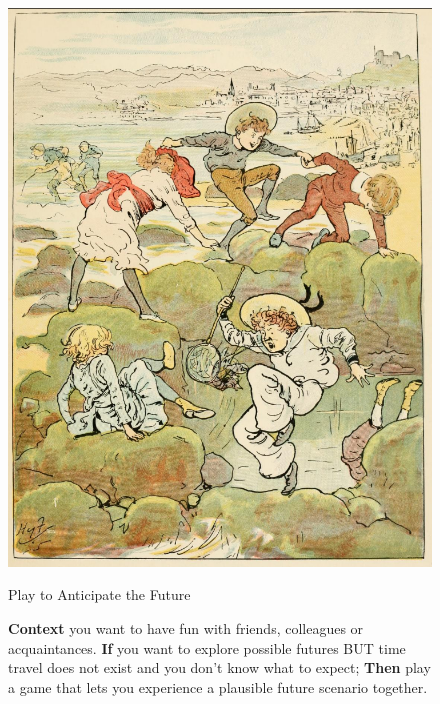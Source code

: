 \documentclass{article}
\begin{document}
\begin{figure}[p]
\begin{adjustbox}{minipage=[c]{\textwidth-10mm},margin= 5mm 5mm 5mm 5mm, frame=1pt, bgcolor=almond,env=center}%
\begin{center}
\includegraphics[width=.5\paperwidth]{image4.png}
\end{center}
\begin{center}
\begin{minipage}[t]{0.7\paperwidth}\raggedright
\medskip

{\huge Play to Anticipate the Future}
\bigskip

\Large
\textbf{Context} you want to have fun with friends, colleagues or acquaintances.\newline
\textbf{If} you want to explore possible futures BUT time travel does not exist and you don’t know what to expect;\newline
\textbf{Then} play a game that lets you experience a plausible future scenario together.\newline\smallskip


\end{minipage}
\end{center}
\end{adjustbox}
\end{figure}
\end{document}
